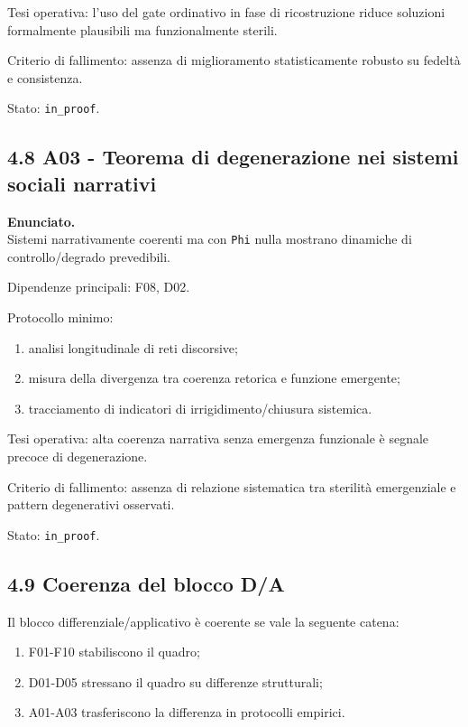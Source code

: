 Tesi operativa:
l'uso del gate ordinativo in fase di ricostruzione riduce soluzioni formalmente plausibili ma funzionalmente sterili.

Criterio di fallimento:
assenza di miglioramento statisticamente robusto su fedeltà e consistenza.

Stato: \texttt{in\_proof}.

\subsection{4.8 A03 - Teorema di degenerazione nei sistemi sociali narrativi}

\textbf{Enunciato.}\\
Sistemi narrativamente coerenti ma con \texttt{Phi} nulla mostrano dinamiche di controllo/degrado prevedibili.

Dipendenze principali:
F08, D02.

Protocollo minimo:

\begin{enumerate}
\def\labelenumi{\arabic{enumi}.}
\tightlist
\item
  analisi longitudinale di reti discorsive;
\item
  misura della divergenza tra coerenza retorica e funzione emergente;
\item
  tracciamento di indicatori di irrigidimento/chiusura sistemica.
\end{enumerate}

Tesi operativa:
alta coerenza narrativa senza emergenza funzionale è segnale precoce di degenerazione.

Criterio di fallimento:
assenza di relazione sistematica tra sterilità emergenziale e pattern degenerativi osservati.

Stato: \texttt{in\_proof}.

\subsection{4.9 Coerenza del blocco D/A}

Il blocco differenziale/applicativo è coerente se vale la seguente catena:

\begin{enumerate}
\def\labelenumi{\arabic{enumi}.}
\tightlist
\item
  F01-F10 stabiliscono il quadro;
\item
  D01-D05 stressano il quadro su differenze strutturali;
\item
  A01-A03 trasferiscono la differenza in protocolli empirici.
\end{enumerate}

